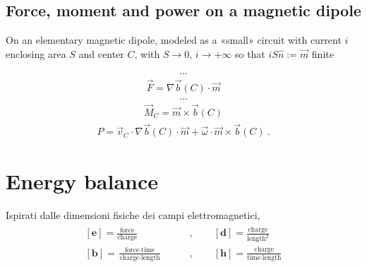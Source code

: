 \documentclass[letterpaper,10pt,italian]{jupyterBook}
\begin{document}
\subsection{Force, moment and power on a magnetic dipole}
\label{\detokenize{ch/energy:force-moment-and-power-on-a-magnetic-dipole}}
\sphinxAtStartPar
On an elementary magnetic dipole, modeled as a «small» circuit with current \(i\) enclosing area \(S\) and center \(C\), with \(S \rightarrow 0\), \(i \rightarrow + \infty\) so that \(i S \hat{n} := \vec{m}\) finite

\sphinxAtStartPar
{}
\begin{equation*}
\begin{split}\dots\end{split}
\end{equation*}\begin{equation*}
\begin{split}\vec{F} = \nabla \vec{b}(C) \cdot \vec{m}\end{split}
\end{equation*}
\sphinxAtStartPar
{}
\begin{equation*}
\begin{split}\dots\end{split}
\end{equation*}\begin{equation*}
\begin{split}\vec{M}_C = \vec{m} \times \vec{b}(C)\end{split}
\end{equation*}
\sphinxAtStartPar
{}
\begin{equation*}
\begin{split}P = \vec{v}_C \cdot \nabla \vec{b}(C) \cdot \vec{m} + \vec{\omega} \cdot \vec{m} \times \vec{b}(C) \ .\end{split}
\end{equation*}

\section{Energy balance}
\label{\detokenize{ch/energy:energy-balance}}
\sphinxAtStartPar
{} 

\sphinxAtStartPar
Ispirati dalle dimensioni fisiche dei campi elettromagnetici,
\begin{equation*}
\begin{split}\begin{aligned}
\left[\mathbf{e}\right] = \frac{\text{force}}{\text{charge}} \qquad & , \qquad
[\mathbf{d}] = \frac{\text{charge}}{\text{length}^2} \\
[\mathbf{b}] = \frac{\text{force}\cdot\text{time}}{\text{charge}\cdot\text{length}} \qquad & , \qquad
[\mathbf{h}] = \frac{\text{charge}}{\text{time} \cdot \text{length}}
\end{aligned}\end{split}
\end{equation*}
\end{document}
